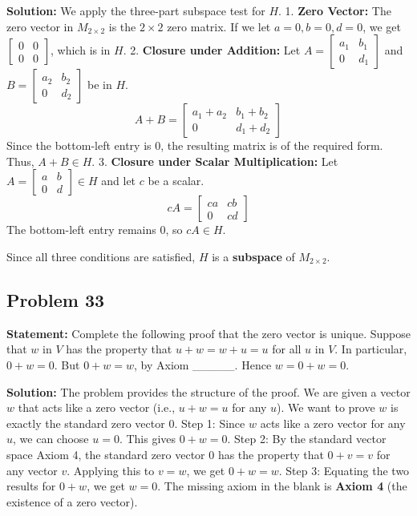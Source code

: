 \documentclass[12pt]{article}
\begin{document}
\textbf{Solution:}
We apply the three-part subspace test for $H$.
1. \textbf{Zero Vector:} The zero vector in $M_{2 \times 2}$ is the $2 \times 2$ zero matrix. If we let $a=0, b=0, d=0$, we get $\begin{bmatrix} 0 & 0 \\ 0 & 0 \end{bmatrix}$, which is in $H$.
2. \textbf{Closure under Addition:} Let $A = \begin{bmatrix} a_1 & b_1 \\ 0 & d_1 \end{bmatrix}$ and $B = \begin{bmatrix} a_2 & b_2 \\ 0 & d_2 \end{bmatrix}$ be in $H$.
\[ A + B = \begin{bmatrix} a_1+a_2 & b_1+b_2 \\ 0 & d_1+d_2 \end{bmatrix} \]
Since the bottom-left entry is $0$, the resulting matrix is of the required form. Thus, $A+B \in H$.
3. \textbf{Closure under Scalar Multiplication:} Let $A = \begin{bmatrix} a & b \\ 0 & d \end{bmatrix} \in H$ and let $c$ be a scalar.
\[ cA = \begin{bmatrix} ca & cb \\ 0 & cd \end{bmatrix} \]
The bottom-left entry remains $0$, so $cA \in H$.

Since all three conditions are satisfied, $H$ is a \textbf{subspace} of $M_{2 \times 2}$.

\subsection{Problem 33}
\textbf{Statement:} Complete the following proof that the zero vector is unique. Suppose that $w$ in $V$ has the property that $u + w = w + u = u$ for all $u$ in $V$. In particular, $0 + w = 0$. But $0 + w = w$, by Axiom \_\_\_\_\_. Hence $w = 0 + w = 0$.

\textbf{Solution:}
The problem provides the structure of the proof. We are given a vector $w$ that acts like a zero vector (i.e., $u+w=u$ for any $u$). We want to prove $w$ is exactly the standard zero vector $0$.
Step 1: Since $w$ acts like a zero vector for any $u$, we can choose $u = 0$. This gives $0 + w = 0$.
Step 2: By the standard vector space Axiom 4, the standard zero vector $0$ has the property that $0 + v = v$ for any vector $v$. Applying this to $v = w$, we get $0 + w = w$.
Step 3: Equating the two results for $0 + w$, we get $w = 0$.
The missing axiom in the blank is \textbf{Axiom 4} (the existence of a zero vector).
\end{document}
